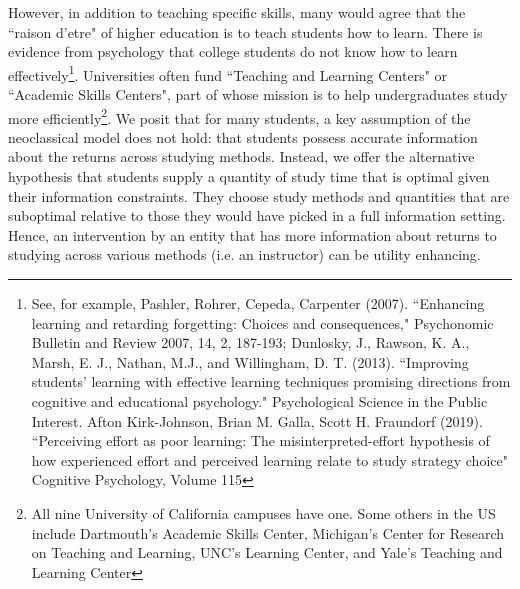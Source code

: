 \documentclass[12pt]{article}
\begin{document}
However, in addition to teaching specific skills, many would agree that the ``raison d'etre" of higher education is to teach students how to learn. There is evidence from psychology that college students do not know how to learn effectively\footnote{See, for example, Pashler, Rohrer, Cepeda, Carpenter (2007). ``Enhancing learning and retarding forgetting: Choices and consequences," Psychonomic Bulletin and Review 2007, 14, 2, 187-193; Dunlosky, J., Rawson, K. A., Marsh, E. J., Nathan, M.J., and Willingham, D. T. (2013). ``Improving students’ learning with effective learning techniques promising directions from cognitive and educational psychology." Psychological Science in the Public Interest. Afton Kirk-Johnson, Brian M. Galla, Scott H. Fraundorf (2019). ``Perceiving effort as poor learning: The misinterpreted-effort hypothesis of how experienced effort and perceived learning relate to study strategy choice" Cognitive Psychology, Volume 115}. Universities often fund ``Teaching and Learning Centers" or ``Academic Skills Centers", part of whose mission is to help undergraduates study more efficiently\footnote{All nine University of California campuses have one. Some others in the US include Dartmouth's Academic Skills Center, Michigan's Center for Research on Teaching and Learning, UNC's Learning Center, and Yale's Teaching and Learning Center}. We posit that for many students, a key assumption of the neoclassical model does not hold: that students possess accurate information about the returns across studying methods. Instead, we offer the alternative hypothesis that students supply a quantity of study time that is optimal given their information constraints. They choose study methods and quantities that are suboptimal relative to those they would have picked in a full information setting. Hence, an intervention by an entity that has more information about returns to studying across various methods (i.e. an instructor) can be utility enhancing. 
\end{document}
